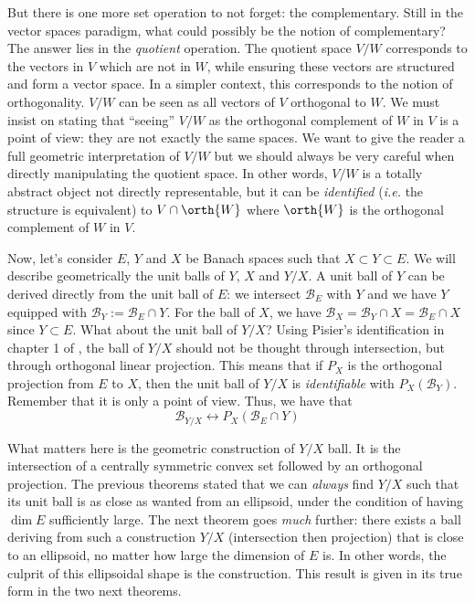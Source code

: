 But there is one more set operation to not forget: the complementary. Still in the vector spaces paradigm, what could possibly be the notion of complementary? The answer lies in the \emph{quotient} operation. The quotient space $V/W$ corresponds to the vectors in $V$ which are not in $W$, while ensuring these vectors are structured and form a vector space. In a simpler context, this corresponds to the notion of orthogonality. $V/W$ can be seen as all vectors of $V$ orthogonal to $W$. We must insist on stating that ``seeing'' $V/W$ as the orthogonal complement of $W$ in $V$ is a point of view: they are not exactly the same spaces. We want to give the reader a full geometric interpretation of $V/W$ but we should always be very careful when directly manipulating the quotient space. In other words, $V/W$ is a totally abstract object not directly representable, but it can be \emph{identified} (\emph{i.e.} the structure is equivalent) to $V\cap \orth{W}$ where $\orth{W}$ is the orthogonal complement of $W$ in $V$. 

Now, let's consider $E$, $Y$ and $X$ be Banach spaces such that $X\subset Y\subset E$. We will describe geometrically the unit balls of $Y$, $X$ and $Y/X$.
A unit ball of $Y$ can be derived directly from the unit ball of $E$: we intersect $\mathcal{B}_E$ with $Y$ and we have $Y$ equipped with $\mathcal{B}_Y := \mathcal{B}_E\cap Y$. For the ball of $X$, we have $\mathcal{B}_X = \mathcal{B}_Y \cap X = \mathcal{B}_E\cap X$ since $Y\subset E$.
What about the unit ball of $Y/X$? Using Pisier's identification in chapter 1 of \cite{pisierVolumeConvexBodies1989}, the ball of $Y/X$ should not be thought through intersection, but through orthogonal linear projection. This means that if $P_X$ is the orthogonal projection from $E$ to $X$, then the unit ball of $Y/X$ is \emph{identifiable} with $P_X(\mathcal{B}_Y)$. Remember that it is only a point of view. Thus, we have that 
$$\mathcal{B}_{Y/X} \longleftrightarrow P_X(\mathcal{B}_E\cap Y)$$

What matters here is the geometric construction of $Y/X$ ball. It is the intersection of a centrally symmetric convex set followed by an orthogonal projection. The previous theorems stated that we can \emph{always} find $Y/X$ such that its unit ball is as close as wanted from an ellipsoid, under the condition of having $\dim E$ sufficiently large. The next theorem goes \emph{much} further: there exists a ball deriving from such a construction $Y/X$ (intersection then projection) that is close to an ellipsoid, no matter how large the dimension of $E$ is. In other words, the culprit of this ellipsoidal shape is the construction. This result is given in its true form in the two next theorems. 

